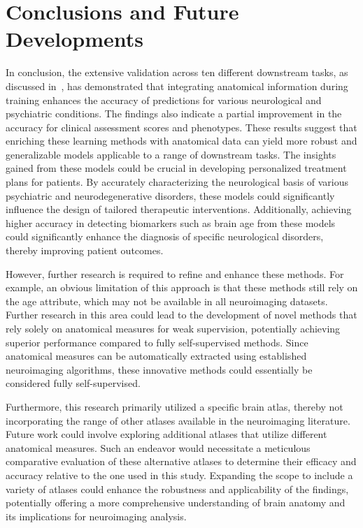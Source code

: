 \chapter{Conclusions and Future Developments}

In conclusion, the extensive validation across ten different downstream tasks,
as discussed in~, has demonstrated that integrating anatomical
information during training enhances the accuracy of predictions for various
neurological and psychiatric conditions. The findings also indicate a partial
improvement in the accuracy for clinical assessment scores and phenotypes. These
results suggest that enriching these learning methods with anatomical data can
yield more robust and generalizable models applicable to a range of downstream
tasks. The insights gained from these models could be crucial in developing
personalized treatment plans for patients. By accurately characterizing the
neurological basis of various psychiatric and neurodegenerative disorders, these
models could significantly influence the design of tailored therapeutic
interventions. Additionally, achieving higher accuracy in detecting biomarkers
such as brain age from these models could significantly enhance the diagnosis of
specific neurological disorders, thereby improving patient outcomes. 

However, further research is required to refine and enhance these methods. For
example, an obvious limitation of this approach is that these methods still rely
on the age attribute, which may not be available in all neuroimaging datasets.
Further research in this area could lead to the development of novel methods
that rely solely on anatomical measures for weak supervision, potentially
achieving superior performance compared to fully self-supervised methods. Since
anatomical measures can be automatically extracted using established
neuroimaging algorithms, these innovative methods could essentially be
considered fully self-supervised.

Furthermore, this research primarily utilized a specific brain atlas, thereby
not incorporating the range of other atlases available in the neuroimaging
literature. Future work could involve exploring additional atlases that utilize
different anatomical measures. Such an endeavor would necessitate a meticulous
comparative evaluation of these alternative atlases to determine their efficacy
and accuracy relative to the one used in this study. Expanding the scope to
include a variety of atlases could enhance the robustness and applicability of
the findings, potentially offering a more comprehensive understanding of brain
anatomy and its implications for neuroimaging analysis.

